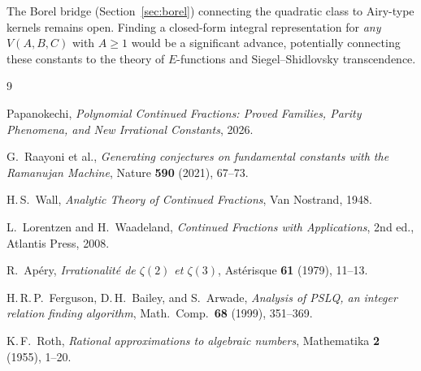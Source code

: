 \documentclass[11pt,a4paper]{article}
\theoremstyle{definition}
\theoremstyle{remark}
\begin{document}
The Borel bridge (Section~\ref{sec:borel}) connecting the quadratic
class to Airy-type kernels remains open.  Finding a closed-form integral
representation for \emph{any} $V(A,B,C)$ with $A \ge 1$ would be a
significant advance, potentially connecting these constants to the theory
of $E$-functions and Siegel--Shidlovsky transcendence.

\begin{thebibliography}{9}

Papanokechi,
\textit{Polynomial Continued Fractions: Proved Families, Parity Phenomena,
and New Irrational Constants},
2026.

G.~Raayoni et al.,
\textit{Generating conjectures on fundamental constants with the Ramanujan Machine},
Nature \textbf{590} (2021), 67--73.

H.\,S.~Wall,
\textit{Analytic Theory of Continued Fractions},
Van Nostrand, 1948.

L.~Lorentzen and H.~Waadeland,
\textit{Continued Fractions with Applications},
2nd ed., Atlantis Press, 2008.

R.~Ap\'ery,
\textit{Irrationalit\'e de $\zeta(2)$ et $\zeta(3)$},
Ast\'erisque \textbf{61} (1979), 11--13.

H.\,R.\,P.~Ferguson, D.\,H.~Bailey, and S.~Arwade,
\textit{Analysis of PSLQ, an integer relation finding algorithm},
Math.\ Comp.\ \textbf{68} (1999), 351--369.

K.\,F.~Roth,
\textit{Rational approximations to algebraic numbers},
Mathematika \textbf{2} (1955), 1--20.

\end{thebibliography}
\end{document}

